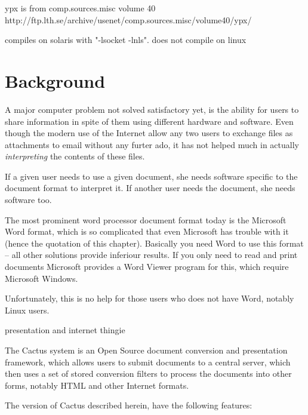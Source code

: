 













ypx is from comp.sources.misc volume 40
http://ftp.lth.se/archive/usenet/comp.sources.misc/volume40/ypx/

compiles on solaris with "-lsocket -lnls".  does not compile
on linux



\section{Background}

A major computer problem not solved satisfactory yet, is the
ability for users to share information in spite of them
using different hardware and software.  Even though the
modern use of the Internet allow any two users to exchange
files as attachments to email without any furter ado, it has
not helped much in actually \textit{interpreting} the
contents of these files.

If a given user needs to use a given document, she needs
software specific to the document format to interpret it.
If another user needs the document, she needs software too.

The most prominent word processor document format today is
the Microsoft Word format, which is so complicated that even
Microsoft has trouble with it (hence the quotation of this
chapter).  Basically you need Word to use this format -- all
other solutions provide inferiour results.  If you only need
to read and print documents Microsoft provides a Word Viewer
program for this, which require Microsoft Windows.

Unfortunately, this is no help for those users who does not
have Word, notably Linux users.

\textsf{presentation and internet thingie}




The Cactus system is an Open Source document conversion and
presentation framework, which allows users to submit
documents to a central server, which then uses a set of
stored conversion filters to process the documents into
other forms, notably HTML and other Internet formats.

The version of Cactus described herein, have the following
features:

